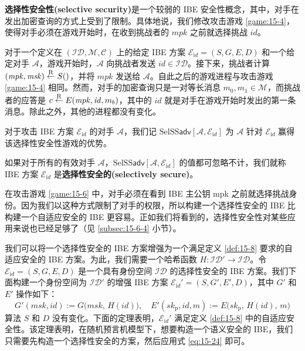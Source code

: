 \textbf{选择性安全性(selective security)}是一个较弱的 IBE 安全性概念，其中，对手在发出加密查询的方式上受到了限制。具体地说，我们修改攻击游戏 \ref{game:15-4}，使得对手必须在游戏开始时，在收到挑战者的 $\mathit{mpk}$ 之前就选择挑战 $\mathit{id}$。

\begin{game}[选择性语义安全性]\label{game:15-6}
对于一个定义在 $(\mathcal{ID},\mathcal{M},\mathcal{C})$ 上的给定 IBE 方案 $\mathcal{E}_{\mathrm{i}d}=(S,G,E,D)$ 和一个给定对手 $\mathcal{A}$，游戏开始时，$\mathcal{A}$ 向挑战者发送 $\mathit{id}\in\mathcal{ID}$。接下来，挑战者计算 $(\mathit{mpk},\mathit{msk})\overset{\rm R}\leftarrow S()$，并将 $\mathit{mpk}$ 发送给 $\mathcal{A}$。自此之后的游戏进程与攻击游戏 \ref{game:15-4} 相同。然而，对手的加密查询只是一对等长消息 $m_0,m_1\in\mathcal{M}$，而挑战者的应答是 $c\overset{\rm R}\leftarrow E(\mathit{mpk},\mathit{id},m_b)$，其中的 $\mathit{id}$ 就是对手在游戏开始时发出的第一条消息。除此之外，其他的进程都没有变化。

对于攻击 IBE 方案 $\mathcal{E}_{\mathrm{i}d}$ 的对手 $\mathcal{A}$，我们记 $\mathrm{SelSS}\mathsf{adv}[\mathcal{A},\mathcal{E}_{\mathrm{i}d}]$ 为 $\mathcal{A}$ 针对 $\mathcal{E}_{\mathrm{i}d}$ 赢得该选择性安全性游戏的优势。
\end{game}

\begin{definition}[选择性安全性]\label{def:15-10}
如果对于所有的有效对手 $\mathcal{A}$，$\mathrm{SelSS}\mathsf{adv}[\mathcal{A},\mathcal{E}_{\mathrm{i}d}]$ 的值都可忽略不计，我们就称 IBE 方案 $\mathcal{E}_{\mathrm{i}d}$ 是\textbf{选择性安全的(selectively secure)}。
\end{definition}

在攻击游戏 \ref{game:15-6} 中，对手必须在看到 IBE 主公钥 mpk 之前就选择挑战身份。因为我们以这种方式限制了对手的权限，所以构建一个选择性安全的 IBE 比构建一个自适应安全的 IBE 更容易。正如我们将看到的，选择性安全性对某些应用来说也已经足够了（见 \ref{subsec:15-6-4} 小节）。

\vspace{5pt}

我们可以将一个选择性安全的 IBE 方案增强为一个满足定义 \ref{def:15-8} 要求的自适应安全的 IBE 方案。为此，我们需要一个哈希函数 $H:\mathcal{ID}'\to\mathcal{ID}$。令 $\mathcal{E}_{\mathrm{i}d}=(S,G,E,D)$ 是一个具有身份空间 $\mathcal{ID}$ 的选择性安全的 IBE 方案。我们下面构建一个身份空间为 $\mathcal{ID}'$ 的增强 IBE 方案 $\mathcal{E}_{\mathrm{i}d}'=(S,G',E',D)$，其中 $G'$ 和 $E'$ 操作如下：
\begin{equation}\label{eq:15-24}
G'(\mathit{msk},\mathit{id})
:=G\big(\mathit{msk},\,H(\mathit{id})\big),
\quad
E'(\mathit{sk}_\mathrm{p},\mathit{id},m)
:=
E\big(\mathit{sk}_\mathrm{p},\,H(\mathit{id}),\,m\big)
\end{equation}
算法 $S$ 和 $D$ 没有变化。下面的定理表明，$\mathcal{E}_{\mathrm{i}d}'$ 满足定义 \ref{def:15-8} 中的自适应安全性。该定理表明，在随机预言机模型下，想要构造一个语义安全的 IBE，我们只需要先构造一个选择性安全的方案，然后应用式 \ref{eq:15-24} 即可。


